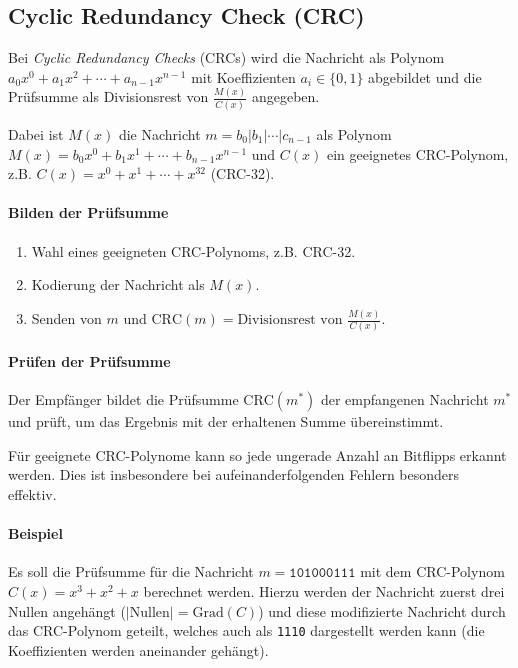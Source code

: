 		\subsection{Cyclic Redundancy Check (CRC)}
			Bei \textit{Cyclic Redundancy Checks} (CRCs)  wird die Nachricht als Polynom \( a_0x^0 + a_1x^2 + \cdots + a_{n-1}x^{n-1} \) mit Koeffizienten \( a_i \in \{0,1\} \) abgebildet und die Prüfsumme als Divisionsrest von \( \frac{M(x)}{C(x)} \) angegeben.

			Dabei ist \( M(x) \) die Nachricht \( m = b_0 \vert b_1 \vert \cdots \vert c_{n-1} \) als Polynom \( M(x) = b_0x^0 + b_1x^1 + \cdots + b_{n-1}x^{n-1} \) und \(C(x)\) ein geeignetes CRC-Polynom, z.B. \( C(x) = x^0 + x^1 + \cdots + x^32 \) (CRC-32).

			\paragraph{Bilden der Prüfsumme}
				\begin{enumerate}
					\item Wahl eines geeigneten CRC-Polynoms, z.B. CRC-32.
					\item Kodierung der Nachricht als \( M(x) \).
					\item Senden von \(m\) und \( \textrm{CRC}(m) = \textrm{Divisionsrest von } \frac{M(x)}{C(x)} \).
				\end{enumerate}

			\paragraph{Prüfen der Prüfsumme}
				Der Empfänger bildet die Prüfsumme \( \textrm{CRC}(m^*) \) der empfangenen Nachricht \( m^* \) und prüft, um das Ergebnis mit der erhaltenen Summe übereinstimmt.

				Für geeignete CRC-Polynome kann so jede ungerade Anzahl an Bitflipps erkannt werden. Dies ist insbesondere bei aufeinanderfolgenden Fehlern besonders effektiv.

			\paragraph{Beispiel}
				Es soll die Prüfsumme für die Nachricht \( m = \texttt{101000111} \) mit dem CRC-Polynom \( C(x) = x^3 + x^2 + x \) berechnet werden. Hierzu werden der Nachricht zuerst drei Nullen angehängt (\( \lvert\text{Nullen}\rvert = \text{Grad}(C) \)) und diese modifizierte Nachricht durch das CRC-Polynom geteilt, welches auch als \texttt{1110} dargestellt werden kann (die Koeffizienten werden aneinander gehängt).

